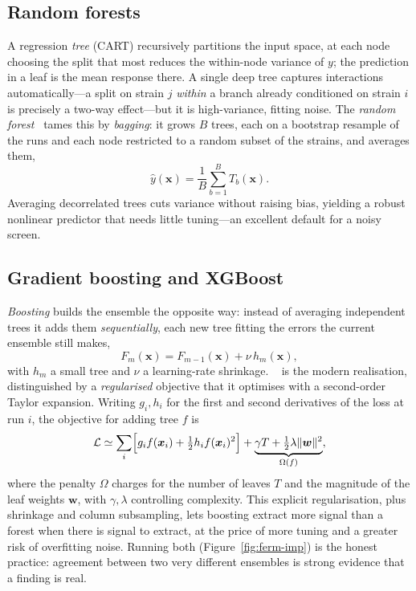 \subsection{Random forests}

A regression \emph{tree} (CART) recursively partitions the input space, at each
node choosing the split that most reduces the within-node variance of $y$; the
prediction in a leaf is the mean response there. A single deep tree captures
interactions automatically---a split on strain $j$ \emph{within} a branch already
conditioned on strain $i$ is precisely a two-way effect---but it is high-variance,
fitting noise. The \emph{random forest}~\cite{breiman} tames this by
\emph{bagging}: it grows $B$ trees, each on a bootstrap resample of the runs and
each node restricted to a random subset of the strains, and averages them,
%
\begin{equation}
\hat y(\bm x) = \frac1B \sum_{b=1}^{B} T_b(\bm x).
\end{equation}
%
Averaging decorrelated trees cuts variance without raising bias, yielding a robust
nonlinear predictor that needs little tuning---an excellent default for a noisy
screen.

\subsection{Gradient boosting and XGBoost}

\emph{Boosting} builds the ensemble the opposite way: instead of averaging
independent trees it adds them \emph{sequentially}, each new tree fitting the
errors the current ensemble still makes,
%
\begin{equation}
F_m(\bm x) = F_{m-1}(\bm x) + \nu\, h_m(\bm x),
\end{equation}
%
with $h_m$ a small tree and $\nu$ a learning-rate shrinkage. ~\cite{xgboost}
is the modern realisation, distinguished by a \emph{regularised} objective that it
optimises with a second-order Taylor expansion. Writing $g_i,h_i$ for the first and
second derivatives of the loss at run $i$, the objective for adding tree $f$ is
%
\begin{equation}
\mathcal L \simeq \sum_i \Bigl[g_i f(\bm x_i)
 + \tfrac12 h_i f(\bm x_i)^2\Bigr]
 + \underbrace{\gamma T + \tfrac12\lambda\|\bm w\|^2}_{\Omega(f)},
\label{eq:xgb}
\end{equation}
%
where the penalty $\Omega$ charges for the number of leaves $T$ and the magnitude
of the leaf weights $\bm w$, with $\gamma,\lambda$ controlling complexity. This
explicit regularisation, plus shrinkage and column subsampling, lets boosting
extract more signal than a forest when there is signal to extract, at the price of
more tuning and a greater risk of overfitting noise. Running both
(Figure~\ref{fig:ferm-imp}) is the honest practice: agreement between two very
different ensembles is strong evidence that a finding is real.


